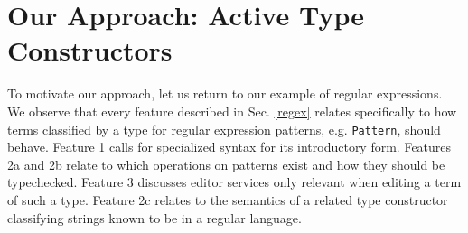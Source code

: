 \section{Our Approach: Active Type Constructors}\label{contributions}

To motivate our approach, let us return to our example of regular expressions. We observe that every feature described in Sec. \ref{regex} relates specifically to how terms classified by a type for regular expression patterns, e.g. \verb|Pattern|, should behave. Feature 1 calls for specialized syntax for its introductory form. Features 2a and 2b relate to which operations on patterns exist and how they should be typechecked. Feature 3 discusses editor services only relevant when editing a term of such a type. Feature 2c relates to the semantics of a related  type constructor classifying strings known to be in a regular language.%

